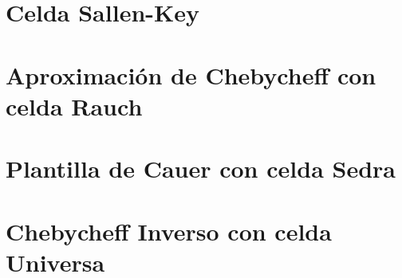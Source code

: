 







\tableofcontents
\newpage

\section{Celda Sallen-Key}
	

\section{Aproximación de Chebycheff con celda Rauch}
		
	
\section{Plantilla de Cauer con celda Sedra}
		
	
\section{Chebycheff Inverso con celda Universa}
		

